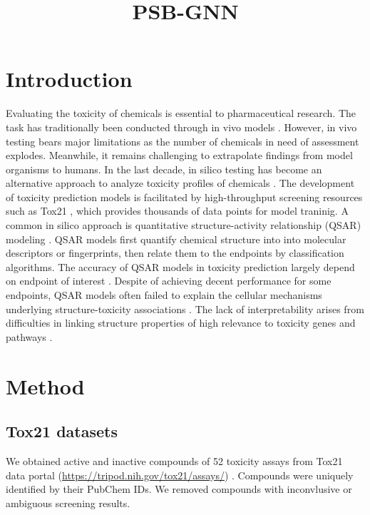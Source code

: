 \documentclass{article}
\begin{document}
 
\title{PSB-GNN}
\maketitle

\section{Introduction} 
Evaluating the toxicity of chemicals is essential to pharmaceutical research.
The task has traditionally been conducted through in vivo models \cite{fischer2020toxicity}.
However, in vivo testing bears major limitations as the number of chemicals in need of assessment explodes.
Meanwhile, it remains challenging to extrapolate findings from model organisms to humans.
In the last decade, in silico testing has become an alternative approach to analyze toxicity profiles of chemicals \cite{raies2016silico}.
The development of toxicity prediction models is facilitated by high-throughput screening resources such as Tox21 \cite{huang2016quantitative}, which provides thousands of data points for model traninig.
A common in silico approach is quantitative structure-activity relationship (QSAR) modeling \cite{cherkasov2014qsar}.
QSAR models first quantify chemical structure into into molecular descriptors or fingerprints, then relate them to the endpoints by classification algorithms.
The accuracy of QSAR models in toxicity prediction largely depend on endpoint of interest \cite{valerio2009silico}.
Despite of achieving decent performance for some endpoints, QSAR models often failed to explain the cellular mechanisms underlying structure-toxicity associations \cite{polishchuk2017interpretation}.
The lack of interpretability arises from difficulties in linking structure properties of high relevance to toxicity genes and pathways \cite{cruz2017systemic}. 

\section{Method}

\subsection{Tox21 datasets}
We obtained active and inactive compounds of 52 toxicity assays from Tox21 data portal (\url{https://tripod.nih.gov/tox21/assays/}) \cite{huang2016quantitative}. 
Compounds were uniquely identified by their PubChem IDs. 
We removed compounds with inconvlusive or ambiguous screening results.  
\end{document}

